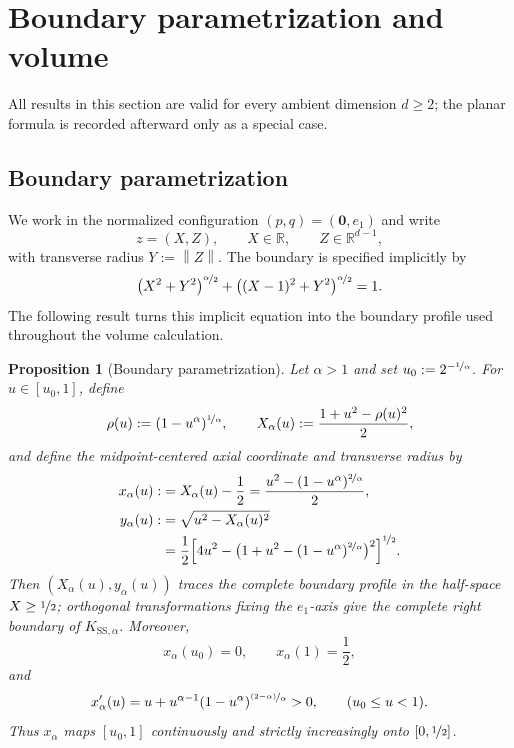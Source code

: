 \documentclass[a4paper,fleqn]{cas-dc}
\newtheorem{proposition}{Proposition}
\theoremstyle{definition}
\theoremstyle{remark}
\newcommand{\R}{\mathds{R}}
\newcommand{\norm}[1]{\left\lVert #1\right\rVert}
\newcommand{\0}{\mathbf{0}}
\begin{document}
\section{Boundary parametrization and volume}
\label{sec:boundary-volume}

All results in this section are valid for every ambient dimension $d\geq2$;
the planar formula is recorded afterward only as a special case.

\subsection{Boundary parametrization}

We work in the normalized configuration $(p,q)=(\0,e_1)$ and write
\begin{equation}
z=(X,Z),\qquad X\in\R,\qquad Z\in\R^{d-1},
\end{equation}
with transverse radius $Y:=\norm{Z}$. The boundary is specified implicitly by
\begin{equation}
\left(X^2+Y^2\right)^{\nicefrac{\alpha}{2}}
+
\left((X-1)^2+Y^2\right)^{\nicefrac{\alpha}{2}}
=1.
\end{equation}
The following result turns this implicit equation into the boundary profile
used throughout the volume calculation.

\begin{proposition}[Boundary parametrization]
\label{prop:boundary-parametrization}
Let $\alpha>1$ and set $u_0:=2^{-\nicefrac{1}{\alpha}}$. For
$u\in[u_0,1]$, define
\begin{equation}
\rho(u):=(1-u^\alpha)^{\nicefrac{1}{\alpha}},
\qquad
X_\alpha(u):=\frac{1+u^2-\rho(u)^2}{2},
\end{equation}
and define the midpoint-centered axial coordinate and transverse radius by
\begin{align}
x_\alpha(u)
:&=X_\alpha(u)-\frac12
=\frac{
u^2-(1-u^\alpha)^{\nicefrac{2}{\alpha}}
}{2},
\label{eq:x-alpha}
\\
y_\alpha(u)
:&=\sqrt{u^2-X_\alpha(u)^2}
\notag
\\
&=\frac12\Bigl[
4u^2
-\bigl(
1+u^2-(1-u^\alpha)^{\nicefrac{2}{\alpha}}
\bigr)^2
\Bigr]^{\nicefrac12}.
\label{eq:y-alpha}
\end{align}
Then $(X_\alpha(u),y_\alpha(u))$ traces the complete boundary profile in the
half-space $X\geq \nicefrac{1}{2}$; orthogonal transformations
fixing the $e_1$-axis give the complete right
boundary of $K_{\mathrm{SS},\alpha}$. Moreover,
\begin{equation}
x_\alpha(u_0)=0,
\qquad
x_\alpha(1)=\frac12,
\end{equation}
and
\begin{equation}\label{eq:x-prime}
x_\alpha'(u)
=
u+u^{\alpha-1}(1-u^\alpha)^{\nicefrac{(2-\alpha)}{\alpha}}>0,
\qquad (u_0\leq u<1).
\end{equation}
Thus $x_\alpha$ maps $[u_0,1]$ continuously and strictly increasingly onto
$[0,\nicefrac{1}{2}]$.
\end{proposition}
\end{document}
